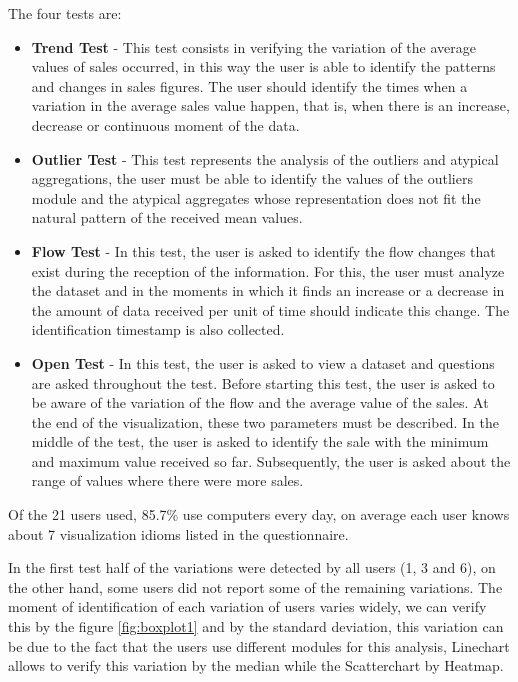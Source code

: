 \documentclass[letterpaper, 10 pt, conference]{ieeeconf}  %
\begin{document}
The four tests are: 
\begin{itemize}
    \item \textbf{Trend Test} - This test consists in verifying the variation of the average values of sales occurred, in this way the user is able to identify the patterns and changes in sales figures. The user should identify the times when a variation in the average sales value happen, that is, when there is an increase, decrease or continuous moment of the data.
    \item \textbf{Outlier Test} - This test represents the analysis of the outliers and atypical aggregations, the user must be able to identify the values of the outliers module and the atypical aggregates whose representation does not fit the natural pattern of the received mean values.
    \item \textbf{Flow Test} - In this test, the user is asked to identify the flow changes that exist during the reception of the information. For this, the user must analyze the dataset and in the moments in which it finds an increase or a decrease in the amount of data received per unit of time should indicate this change. The identification timestamp is also collected.
    \item \textbf{Open Test} - In this test, the user is asked to view a dataset and questions are asked throughout the test. Before starting this test, the user is asked to be aware of the variation of the flow and the average value of the sales. At the end of the visualization, these two parameters must be described. In the middle of the test, the user is asked to identify the sale with the minimum and maximum value received so far. Subsequently, the user is asked about the range of values where there were more sales.
\end{itemize}

Of the 21 users used, 85.7\% use computers every day, on average each user knows about 7 visualization idioms listed in the questionnaire.

In the first test half of the variations were detected by all users (1, 3 and 6), on the other hand, some users did not report some of the remaining variations. The moment of identification of each variation of users varies widely, we can verify this by the figure \ref{fig:boxplot1} and by the standard deviation, this variation can be due to the fact that the users use different modules for this analysis, Linechart allows to verify this variation by the median while the Scatterchart by Heatmap.
\end{document}
